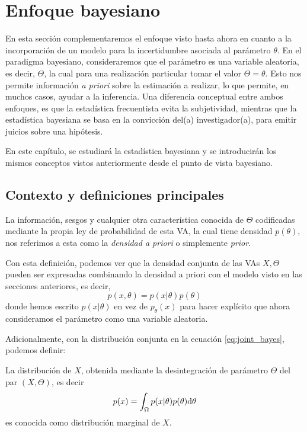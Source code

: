 \chapter{Enfoque bayesiano}

En esta sección complementaremos el enfoque visto hasta ahora en cuanto a la incorporación de un modelo para la incertidumbre asociada al parámetro $\theta$. En el paradigma bayesiano, consideraremos que el parámetro es una variable aleatoria, es decir, $\Theta$, la cual para una realización particular tomar el valor $\Theta = \theta$. Esto nos permite información \emph{a priori} sobre la estimación a realizar, lo que permite, en muchos casos, ayudar a la inferencia. Una diferencia conceptual entre ambos enfoques, es que la estadística frecuentista evita la subjetividad, mientras que la estadística bayesiana se basa en la convicción del(a) investigador(a), para emitir juicios sobre una hipótesis.

En este capítulo, se estudiará la estadística bayesiana y se introducirán los mismos conceptos vistos anteriormente desde el punto de vista bayesiano.




\section{Contexto y definiciones principales}

\begin{definition}
La información, sesgos y cualquier otra característica conocida de $\Theta$ codificadas mediante la propia ley de probabilidad de esta VA, la cual tiene densidad $p(\theta)$, nos referimos a esta como la \emph{densidad a priori} o simplemente \emph{prior}.
\end{definition}

Con esta definición, podemos ver que la densidad conjunta de las VAs $X,\Theta$ pueden ser expresadas combinando la densidad a priori con el modelo visto en las secciones anteriores, es decir, 
\begin{equation}
    p(x,\theta) = p(x|\theta)p(\theta)
    \label{eq:joint_bayes}
\end{equation}
donde hemos escrito $p(x|\theta)$ en vez de $p_\theta(x)$ para hacer explícito que ahora consideramos el parámetro como una variable aleatoria. 

Adicionalmente, con la distribución conjunta en la ecuación \eqref{eq:joint_bayes}, podemos definir:

\begin{definition}
La distribución de $X$, obtenida mediante la desintegración de parámetro $\Theta$ del par $(X,\Theta)$, es decir 
\begin{equation}
    p(x) = \int_\Omega p(x|\theta)p(\theta){\text{d}}\theta
\end{equation}
es conocida como distribución marginal de $X$.
\end{definition}

